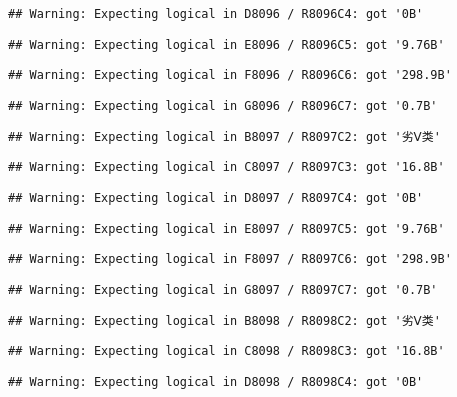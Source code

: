 \documentclass[
]{article}
\begin{document}
\begin{verbatim}
## Warning: Expecting logical in D8096 / R8096C4: got '0B'
\end{verbatim}

\begin{verbatim}
## Warning: Expecting logical in E8096 / R8096C5: got '9.76B'
\end{verbatim}

\begin{verbatim}
## Warning: Expecting logical in F8096 / R8096C6: got '298.9B'
\end{verbatim}

\begin{verbatim}
## Warning: Expecting logical in G8096 / R8096C7: got '0.7B'
\end{verbatim}

\begin{verbatim}
## Warning: Expecting logical in B8097 / R8097C2: got '劣Ⅴ类'
\end{verbatim}

\begin{verbatim}
## Warning: Expecting logical in C8097 / R8097C3: got '16.8B'
\end{verbatim}

\begin{verbatim}
## Warning: Expecting logical in D8097 / R8097C4: got '0B'
\end{verbatim}

\begin{verbatim}
## Warning: Expecting logical in E8097 / R8097C5: got '9.76B'
\end{verbatim}

\begin{verbatim}
## Warning: Expecting logical in F8097 / R8097C6: got '298.9B'
\end{verbatim}

\begin{verbatim}
## Warning: Expecting logical in G8097 / R8097C7: got '0.7B'
\end{verbatim}

\begin{verbatim}
## Warning: Expecting logical in B8098 / R8098C2: got '劣Ⅴ类'
\end{verbatim}

\begin{verbatim}
## Warning: Expecting logical in C8098 / R8098C3: got '16.8B'
\end{verbatim}

\begin{verbatim}
## Warning: Expecting logical in D8098 / R8098C4: got '0B'
\end{verbatim}
\end{document}
